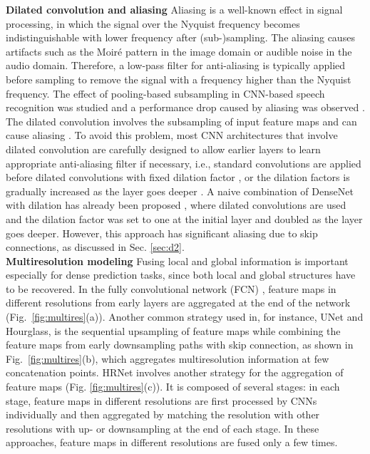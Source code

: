 \documentclass[final]{cvpr}
\def\NEW#1{\textcolor{black}{#1}}
\begin{document}
\textbf{Dilated convolution and aliasing} \hspace{1mm}
Aliasing is a well-known effect in signal processing, in which the signal over the Nyquist frequency becomes indistinguishable with lower frequency after (sub-)sampling. The aliasing causes artifacts such as the Moir\'{e} pattern in the image domain or audible noise in the audio domain. Therefore, a low-pass filter for anti-aliasing is typically applied before sampling to remove the signal with a frequency higher than the Nyquist frequency. The effect of pooling-based subsampling in CNN-based speech recognition was studied and a performance drop caused by aliasing was observed \cite{Gong18}. The dilated convolution involves the subsampling of input feature maps and can cause aliasing \NEW{\cite{Wang18HDC}}. To avoid this problem, most CNN architectures that involve dilated convolution are carefully designed to allow earlier layers to learn appropriate anti-aliasing filter if necessary, i.e., standard convolutions are applied before dilated convolutions with fixed dilation factor \cite{Chen17Deeplab,Yang2020DilatedInception,Wang18HDC,Li20PSConv}, or the dilation factors is gradually increased as the layer goes deeper \cite{Yu16dilation, Aaron2016WN}. 
A naive combination of DenseNet with dilation has already been proposed \cite{Fuchs19}, where dilated convolutions are used and the dilation factor was set to one at the initial layer and doubled as the layer goes deeper. However, this approach has significant aliasing due to skip connections, as discussed in Sec. \ref{sec:d2}. 
\vspace{3mm}\\
\textbf{Multiresolution modeling} \hspace{1mm} 
Fusing local and global information is important especially for dense prediction tasks, since both local and global structures have to be recovered. In the fully convolutional network (FCN) \cite{Long15}, feature maps in different resolutions from early layers are aggregated at the end of the network (Fig.~\ref{fig:multires}(a)). Another common strategy used in, for instance, UNet \cite{Ronneberger15UNet} and Hourglass\cite{Newell2016Hourglass}, is the sequential upsampling of feature maps while combining the feature maps from early downsampling paths with skip connection, as shown in Fig.~\ref{fig:multires}(b), which aggregates multiresolution information at few concatenation points. HRNet \cite{SunXLW19,WangSCJDZLMTWLX19} involves another strategy for the aggregation of feature maps (Fig. \ref{fig:multires}(c)). It is composed of several stages: in each stage, feature maps in different resolutions are first processed by CNNs individually and then aggregated by matching the resolution with other resolutions with up- or downsampling at the end of each stage.  In these approaches, feature maps in different resolutions are fused only a few times. 
\end{document}
